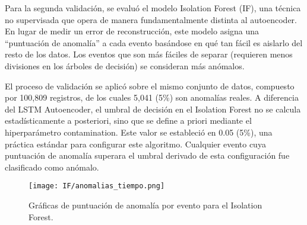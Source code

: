 
Para la segunda validación, se evaluó el modelo Isolation Forest (IF), una técnica no supervisada que opera de manera fundamentalmente distinta al autoencoder. En lugar de medir un error de reconstrucción, este modelo asigna una ``puntuación de anomalía'' a cada evento basándose en qué tan fácil es aislarlo del resto de los datos. Los eventos que son más fáciles de separar (requieren menos divisiones en los árboles de decisión) se consideran más anómalos.

El proceso de validación se aplicó sobre el mismo conjunto de datos, compuesto por 100,809 registros, de los cuales 5,041 (5\%) son anomalías reales. A diferencia del LSTM Autoencoder, el umbral de decisión en el Isolation Forest no se calcula estadísticamente a posteriori, sino que se define a priori mediante el hiperparámetro contamination. Este valor se estableció en 0.05 (5\%), una práctica estándar para configurar este algoritmo. Cualquier evento cuya puntuación de anomalía superara el umbral derivado de esta configuración fue clasificado como anómalo.

\begin{figure}[ht!]
      \centering
      \texttt{[image: IF/anomalias\_tiempo.png]}
      \caption{Gráficas de puntuación de anomalía por evento para el Isolation Forest.}
      \label{fig:anomalias_if}
\end{figure}

